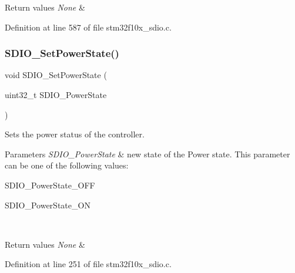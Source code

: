 \begin{DoxyRetVals}{Return values}
{\em None} & \\
\hline
\end{DoxyRetVals}


Definition at line 587 of file stm32f10x\+\_\+sdio.\+c.

\mbox{\label{group___s_d_i_o___private___functions_ga36ecca32b904de74218fbe65cd5f5270}} 
\subsubsection{\texorpdfstring{S\+D\+I\+O\+\_\+\+Set\+Power\+State()}{SDIO\_SetPowerState()}}
{\footnotesize\ttfamily void S\+D\+I\+O\+\_\+\+Set\+Power\+State (\begin{DoxyParamCaption}\item[{uint32\+\_\+t}]{S\+D\+I\+O\+\_\+\+Power\+State }\end{DoxyParamCaption})}



Sets the power status of the controller. 


\begin{DoxyParams}{Parameters}
{\em S\+D\+I\+O\+\_\+\+Power\+State} & new state of the Power state. This parameter can be one of the following values\+: \begin{DoxyItemize}
\item S\+D\+I\+O\+\_\+\+Power\+State\+\_\+\+O\+FF \item S\+D\+I\+O\+\_\+\+Power\+State\+\_\+\+ON \end{DoxyItemize}
\\
\hline
\end{DoxyParams}

\begin{DoxyRetVals}{Return values}
{\em None} & \\
\hline
\end{DoxyRetVals}


Definition at line 251 of file stm32f10x\+\_\+sdio.\+c.

\mbox{\label{group___s_d_i_o___private___functions_ga24e210c185d5a7855cbaff4472a8f8d1}} 
